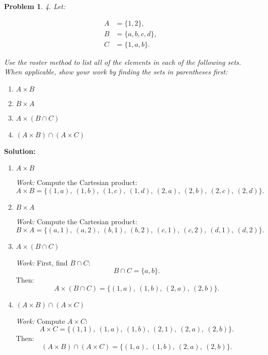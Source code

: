 \documentclass[12pt]{article}
\newtheorem{problem}{Problem}
\theoremstyle{definition}
\begin{document}
\begin{problem}
4. Let:

\begin{align*}
    A &= \{1, 2\}, \\
    B &= \{a, b, c, d\}, \\
    C &= \{1, a, b\}.
\end{align*}

Use the roster method to list all of the elements in each of the following sets. When applicable, show your work by finding the sets in parentheses first:

\begin{enumerate}[label=(\alph*)]
    \item $A \times B$
    \item $B \times A$
    \item $A \times (B \cap C)$
    \item $(A \times B) \cap (A \times C)$
\end{enumerate}
\end{problem}

\textbf{Solution:}

\begin{enumerate}[label=(\alph*)]
    \item $A \times B$

    \textit{Work:} Compute the Cartesian product:
    \[
    A \times B = \{ (1, a),\ (1, b),\ (1, c),\ (1, d),\ (2, a),\ (2, b),\ (2, c),\ (2, d) \}.
    \]

    \item $B \times A$

    \textit{Work:} Compute the Cartesian product:
    \[
    B \times A = \{ (a, 1),\ (a, 2),\ (b, 1),\ (b, 2),\ (c, 1),\ (c, 2),\ (d, 1),\ (d, 2) \}.
    \]

    \item $A \times (B \cap C)$

    \textit{Work:} First, find $B \cap C$:
    \[
    B \cap C = \{a, b\}.
    \]
    Then:
    \[
    A \times (B \cap C) = \{ (1, a),\ (1, b),\ (2, a),\ (2, b) \}.
    \]

    \item $(A \times B) \cap (A \times C)$

    \textit{Work:} Compute $A \times C$:
    \[
    A \times C = \{ (1, 1),\ (1, a),\ (1, b),\ (2, 1),\ (2, a),\ (2, b) \}.
    \]
    Then:
    \[
    (A \times B) \cap (A \times C) = \{ (1, a),\ (1, b),\ (2, a),\ (2, b) \}.
    \]

\end{enumerate}

\newpage
\end{document}
